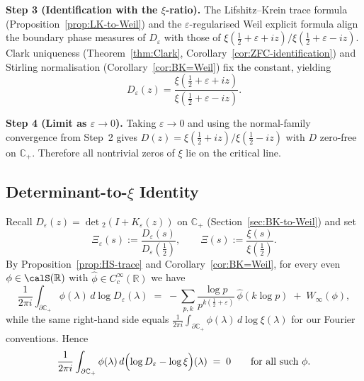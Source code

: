 ﻿\documentclass[12pt,a4paper]{article}
\theoremstyle{definition}
\theoremstyle{remark}
\newcommand{\CC}{\mathbb{C}}
\newcommand{\RR}{\mathbb{R}}
\begin{document}
\textbf{Step 3 (Identification with the $\xi$-ratio).} The Lifshitz--Krein trace formula (Proposition~\ref{prop:LK-to-Weil}) and the $\varepsilon$-regularised Weil explicit formula align the boundary phase measures of $D_\varepsilon$ with those of $\xi(\tfrac{1}{2}+\varepsilon+iz)/\xi(\tfrac{1}{2}+\varepsilon-iz)$. Clark uniqueness (Theorem~\ref{thm:Clark}, Corollary~\ref{cor:ZFC-identification}) and Stirling normalisation (Corollary~\ref{cor:BK=Weil}) fix the constant, yielding
\[
  D_\varepsilon(z) = \frac{\xi(\tfrac{1}{2}+\varepsilon+iz)}{\xi(\tfrac{1}{2}+\varepsilon-iz)}.
\]

\textbf{Step 4 (Limit as $\varepsilon\to0$).} Taking $\varepsilon\to0$ and using the normal-family convergence from Step~2 gives $D(z)=\xi(\tfrac12+iz)/\xi(\tfrac12-iz)$ with $D$ zero-free on $\CC_+$. Therefore all nontrivial zeros of $\xi$ lie on the critical line.

\subsection{Determinant-to-\texorpdfstring{$\xi$}{xi} Identity}\label{sec:det-to-xi}

Recall $D_\varepsilon(z)=\det{}_2(I+K_\varepsilon(z))$ on $\CC_+$ (Section~\ref{sec:BK-to-Weil}) and set
\begin{equation}\label{eq:Xi-eps}
  \Xi_\varepsilon(s):=\frac{D_\varepsilon(s)}{D_\varepsilon(\tfrac12)},\qquad
  \Xi(s):=\frac{\xi(s)}{\xi(\tfrac12)}.
\end{equation}
By Proposition~\ref{prop:HS-trace} and Corollary~\ref{cor:BK=Weil}, for every even $\phi\in\calS(\RR)$ with $\widehat\phi\in C_c^\infty(\RR)$ we have
\begin{equation}\label{eq:Weil-for-D}
  \frac{1}{2\pi i}\int_{\partial\CC_+}\phi(\lambda)\,d\log D_\varepsilon(\lambda)
  \;=\; -\sum_{p,k}\frac{\log p}{p^{k(\frac12+\varepsilon)}}\,\widehat\phi(k\log p)\;+\;W_\infty(\phi),
\end{equation}
while the same right-hand side equals $\frac{1}{2\pi i}\int_{\partial\CC_+}\phi(\lambda)\,d\log \xi(\lambda)$ for our Fourier conventions.
Hence
\begin{equation}\label{eq:boundary-equality}
  \frac{1}{2\pi i}\int_{\partial\CC_+}\phi(\lambda)\,d\Bigl(\log D_\varepsilon-\log \xi\Bigr)(\lambda)\;=\;0
  \qquad\text{for all such }\phi.
\end{equation}
\end{document}
